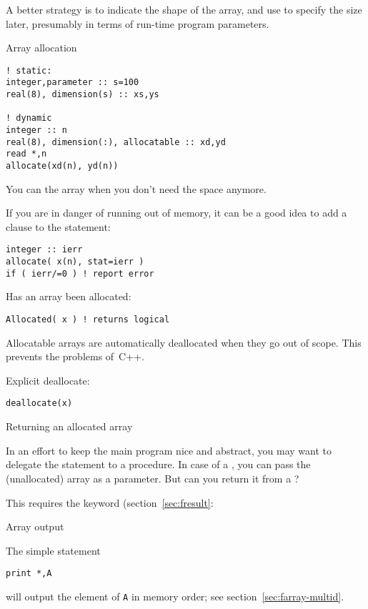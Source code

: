 A better strategy is to indicate the shape of the array, and use
 to specify
the size later, presumably in terms of run-time program parameters.

\begin{block}{Array allocation}
  \label{sl:farray-alloc}
\begin{lstlisting}
! static:
integer,parameter :: s=100
real(8), dimension(s) :: xs,ys

! dynamic
integer :: n
real(8), dimension(:), allocatable :: xd,yd
read *,n
allocate(xd(n), yd(n))
\end{lstlisting}
You can  the array when you don't need the
space anymore.
\end{block}

If you are in danger of running out of memory, it can be a good idea
to add a  clause to the  statement:
\begin{lstlisting}
integer :: ierr
allocate( x(n), stat=ierr )
if ( ierr/=0 ) ! report error
\end{lstlisting}

Has an array been allocated:
\begin{lstlisting}
Allocated( x ) ! returns logical
\end{lstlisting}

Allocatable arrays are automatically deallocated when they go out of
scope. This prevents the  problems of~C++.

Explicit deallocate:
\begin{lstlisting}
deallocate(x)
\end{lstlisting}

 {Returning an allocated array}

In an effort to keep the main program nice and abstract,
you may want to delegate the  statement
to a procedure.
In case of a , you can pass the
(unallocated) array as a parameter.
But can you return it from a ?

This requires the  keyword
(section~\ref{sec:fresult}:
%

 {Array output}

The simple statement
\begin{lstlisting}
print *,A
\end{lstlisting}
will output the element of \lstinline{A} in memory order;
see section~\ref{sec:farray-multid}.

